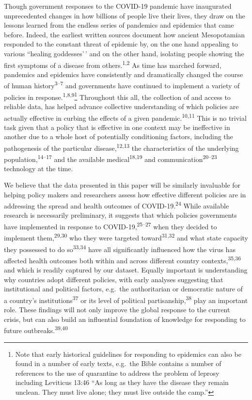 \documentclass[
]{article}
\begin{document}
Though government responses to the COVID-19 pandemic have inaugurated unprecedented changes in how billions of people live their lives, they draw on the lessons learned from the endless series of pandemics and epidemics that came before. Indeed, the earliest written sources document how ancient Mesopotamian responded to the constant threat of epidemic by, on the one hand appealing to various ``healing goddesses'\,' and on the other hand, isolating people showing the first symptoms of a disease from others.\textsuperscript{1,2} As time has marched forward, pandemics and epidemics have consistently and dramatically changed the course of human history\textsuperscript{3--7} and governments have continued to implement a variety of policies in response.\textsuperscript{1,8,9}\footnote{Note that early historical guidelines for responding to epidemics can also be found in a number of early texts, e.g.~the Bible contains a number of references to the use of quarantine to address the problem of leprosy including Leviticus 13:46 ``As long as they have the disease they remain unclean. They must live alone; they must live outside the camp.''} Throughout this all, the collection of and access to reliable data, has helped advance collective understanding of which policies are actually effective in curbing the effects of a given pandemic.\textsuperscript{10,11} This is no trivial task given that a policy that is effective in one context may be ineffective in another due to a whole host of potentially conditioning factors, including the pathogenesis of the particular disease,\textsuperscript{12,13} the characteristics of the underlying population,\textsuperscript{14--17} and the available medical\textsuperscript{18,19} and communication\textsuperscript{20--23} technology at the time.

We believe that the data presented in this paper will be similarly invaluable for helping policy makers and researchers assess how effective different policies are in addressing the spread and health outcomes of COVID-19.\textsuperscript{24} While available research is necessarily preliminary, it suggests that which policies governments have implemented in response to COVID-19,\textsuperscript{25--27} when they decided to implement them,\textsuperscript{29,30} who they were targeted toward\textsuperscript{31,32} and what state capacity they possessed to do so\textsuperscript{33,34} have all significantly influenced how the virus has affected health outcomes both within and across different country contexts,\textsuperscript{35,36} and which is readily captured by our dataset. Equally important is understanding why countries adopt different policies, with early analyses suggesting that institutional and political factors, e.g.~the authoritarian or democratic nature of a country's institutions\textsuperscript{37} or its level of political partisanship,\textsuperscript{38} play an important role. These findings will not only improve the global response to the current crisis, but can also build an influential foundation of knowledge for responding to future outbreaks.\textsuperscript{39,40}
\end{document}
